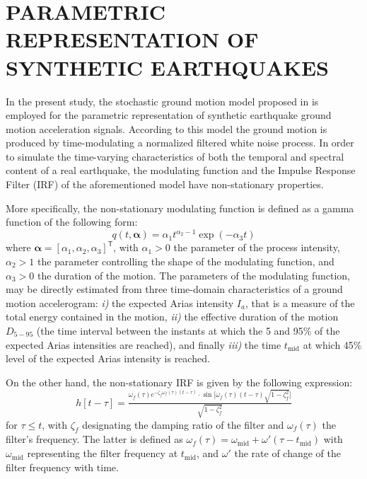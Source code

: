\documentclass[12pt,a4paper,twocolumn,fleqn]{narms}
\newcommand{\bld}[1]{\boldsymbol{#1}}
\newcommand{\beq}{\begin{equation}}
\newcommand{\eeq}{\end{equation}}
\begin{document}
\section{PARAMETRIC REPRESENTATION OF SYNTHETIC EARTHQUAKES}

In the present study, the stochastic ground motion model proposed in  is employed for the parametric representation of synthetic earthquake ground motion acceleration signals. According to this model the ground motion is produced by time-modulating a normalized filtered white noise process. In order to simulate the time-varying characteristics of both the temporal and spectral content of a real earthquake, the modulating function and the Impulse Response Filter (IRF) of the aforementioned model have non-stationary properties. 

More specifically, the non-stationary modulating function is defined as a gamma function of the following form: 
\beq
q(t,{\bld \alpha}) = \alpha_1 t^{\alpha_2-1}\exp(-\alpha_3 t) 
\eeq
where ${\bld \alpha}=[ \alpha_1, \alpha_2, \alpha_3 ]^{\mathsf T}$, with $\alpha_1 > 0$ the parameter of the process intensity, $\alpha_2> 1$ the parameter controlling the shape of the modulating function, and $\alpha_3 > 0$ the duration of the motion. The parameters of the modulating function, may be directly estimated from three time-domain characteristics of a ground motion accelerogram: \emph{i)} the expected Arias intensity $I_a$, that is a measure of the total energy contained in the motion, \emph{ii)} the effective duration of the motion $D_{5-95}$ (the time interval between the instants at which the 5 and 95\% of the expected Arias intensities are reached), and finally \emph{iii)} the time $t_{\text{mid}}$ at which 45\% level of the expected Arias intensity is reached.

On the other hand, the non-stationary IRF is given by the following expression:
\beq
h[t-\tau] = \tfrac{\omega_f(\tau) e^{-\zeta_f \omega_f(\tau) (t-\tau)} \cdot \sin\bigl[ \omega_f(\tau)  (t-\tau) \sqrt{1-\zeta_f^2} \bigr] }{\sqrt{1-\zeta^2_f}} 
\eeq
for $ \tau\leq t $, with $\zeta_f$ designating the damping ratio of the filter and $\omega_f(\tau)$ the filter's frequency. The latter is defined as $\omega_f(\tau) = \omega_{\text{mid}} + \omega'(\tau-t_{\text{mid}})$ with $\omega_{\text{mid}}$ representing the filter frequency at $t_{\text{mid}}$, and $\omega'$ the rate of change of the filter frequency with time. 
\end{document}
